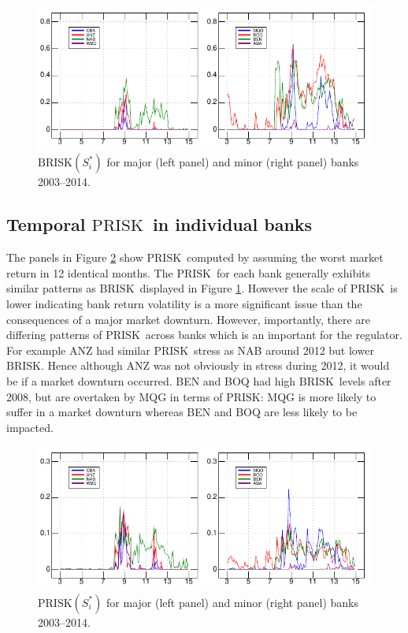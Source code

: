 \documentclass[authoryear]{elsarticle}
\newcommand{\fref}[1]{Figure \ref{#1}}
\newcommand{\br}{\ensuremath{\mathrm{BRISK}}}
\newcommand{\pr}{\ensuremath{\mathrm{PRISK}}}
\begin{document}
\begin{figure}[htbp]
\begin{center}
\includegraphics[width=12cm]{figures/tbrisk.pdf}
\caption{$\br(S_i^*)$  for   major (left panel) and  minor (right panel)  banks 2003--2014.}\label{tbrisk}
\end{center}
\end{figure}

\subsection{Temporal \pr\ in individual banks }

The panels in \fref{tprisk} show \pr\ computed by assuming the worst market return in 12 identical months. The \pr\ for each bank generally exhibits similar patterns as \br\ displayed in \fref{tbrisk}.  However the scale of \pr\ is  lower indicating bank return volatility is a more significant issue than the consequences of a major market downturn.  However, importantly, there are differing patterns of \pr\ across banks which is an important for the regulator. For example ANZ had similar \pr\ stress as NAB around 2012 but lower \br. Hence although ANZ was not obviously in stress during 2012, it would be if a market downturn occurred. BEN and BOQ had high \br\ levels after 2008, but are overtaken by MQG in terms of \pr: MQG is more likely to suffer in a market downturn whereas BEN and BOQ are less likely to be impacted.

\begin{figure}[htbp]
\begin{center}
\includegraphics[width=12cm]{figures/tprisk.pdf}
\caption{$\pr(S_i^*)$  for   major (left panel) and  minor (right panel)  banks 2003--2014.}\label{tprisk}
\end{center}
\end{figure}
\end{document}
